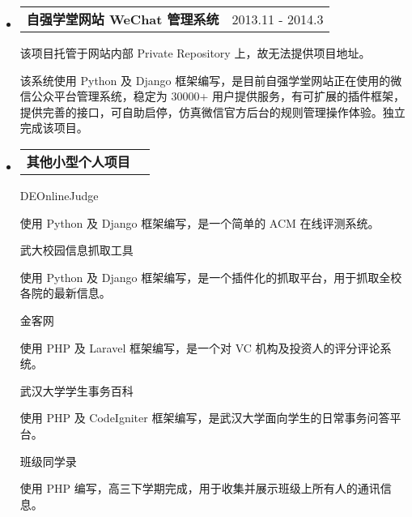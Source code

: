 \documentclass[a4paper,9pt]{article}
\makeatletter
\newcommand{\ressubheading}[2]{
  \begin{tabular*}{172mm}{l@{\extracolsep{\fill}}r}
    \textbf{#1} & #2
  \end{tabular*}\vspace{0pt}}
\makeatother
\begin{document}
\begin{itemize}
\item
  \ressubheading{自强学堂网站 WeChat 管理系统}{2013.11 - 2014.3}

  \begin{adjustwidth}{8mm}{8mm}

  \textnormal{该项目托管于网站内部 Private Repository 上，故无法提供项目地址。}

  \textnormal{该系统使用 Python 及 Django 框架编写，是目前自强学堂网站正在使用的微信公众平台管理系统，稳定为 30000+ 用户提供服务，有可扩展的插件框架，提供完善的接口，可自助启停，仿真微信官方后台的规则管理操作体验。独立完成该项目。}

  \end{adjustwidth}
\end{itemize}

\begin{itemize}
\item
  \ressubheading{其他小型个人项目}{}

  \begin{adjustwidth}{8mm}{8mm}

    \textnormal{DEOnlineJudge \color{link}{https://github.com/doraemonext/DEOnlineJudge/}}

    \hspace{8mm}\textnormal{使用 Python 及 Django 框架编写，是一个简单的 ACM 在线评测系统。}

    \textnormal{武大校园信息抓取工具 \color{link}{https://github.com/doraemonext/zq\_monitor/}}

    \hspace{8mm}\textnormal{使用 Python 及 Django 框架编写，是一个插件化的抓取平台，用于抓取全校各院的最新信息。}

    \textnormal{金客网 \color{link}{https://github.com/doraemonext/vc/}}

    \hspace{8mm}\textnormal{使用 PHP 及 Laravel 框架编写，是一个对 VC 机构及投资人的评分评论系统。}

    \textnormal{武汉大学学生事务百科 \color{link}{https://github.com/doraemonext/yizhanshi\_baike/}}

    \hspace{8mm}\textnormal{使用 PHP 及 CodeIgniter 框架编写，是武汉大学面向学生的日常事务问答平台。}

    \textnormal{班级同学录 \color{link}{https://github.com/doraemonext/classmates/}}

    \hspace{8mm}\textnormal{使用 PHP 编写，高三下学期完成，用于收集并展示班级上所有人的通讯信息。}

  \end{adjustwidth}
\end{itemize}
\end{document}
